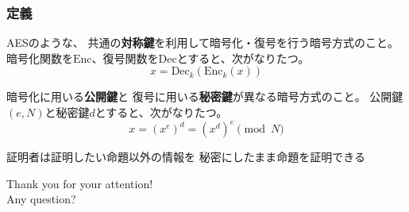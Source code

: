 \newcommand{\Enc}[2]{\text{Enc}_{#1}\left(#2\right)}
\newcommand{\Dec}[2]{\text{Dec}_{#1}\left(#2\right)}

\begin{frame}
  \frametitle{定義}

  \begin{description}
    \item<2->[対称鍵暗号] AESのような、
    共通の\textbf{対称鍵}を利用して暗号化・復号を行う暗号方式のこと。
    暗号化関数を$\text{Enc}$、復号関数を$\text{Dec}$とすると、次がなりたつ。
    \[
      x = \Dec{k}{\Enc{k}{x}}
    \]
    
    \item<3->[RSA暗号] 暗号化に用いる\textbf{公開鍵}と
    復号に用いる\textbf{秘密鍵}が異なる暗号方式のこと。
    公開鍵$(e, N)$と秘密鍵$d$とすると、次がなりたつ。
    \[
      x = (x^e)^d = (x^d)^e \pmod{N}
    \]

    \item<4->[ゼロ知識証明] 証明者は証明したい命題以外の情報を
    秘密にしたまま命題を証明できる
    
  \end{description}
\end{frame}

\begin{frame}
  \centering
  {\Huge Thank you for your attention!\\
    \vspace{1em}
    Any question?
  }
\end{frame}


